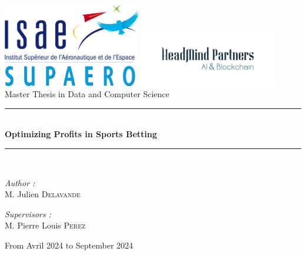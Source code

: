 
\begin{titlepage}

\begin{center}

\includegraphics[width=0.45\textwidth]{components/first_page/images/logo_isae.png}
\includegraphics[width=0.45\textwidth]{components/first_page/images/logo_headmind.png}  \\ [2cm]

{\large Master Thesis in Data and Computer Science}\\[1cm]
\rule{\linewidth}{0.5mm} \\[0.4cm]
{ \huge \bfseries Optimizing Profits in Sports Betting \\[0.4cm] }
\rule{\linewidth}{0.5mm} \\[1.5cm]
\noindent
\begin{minipage}{0.4\textwidth}
  \begin{flushleft} \large
    \emph{Author :}\\
    M. Julien \textsc{Delavande}\\
  \end{flushleft}
\end{minipage}%
\begin{minipage}{0.4\textwidth}
  \begin{flushright} \large
    \emph{Supervisors :} \\
    M. Pierre Louis \textsc{Perez}
  \end{flushright}
\end{minipage}
\vfill
{\large From Avril 2024 to September 2024}
\end{center}
\end{titlepage}